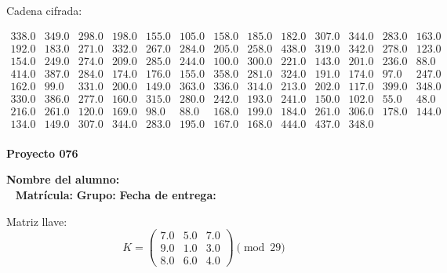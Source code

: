 \documentclass[12pt]{article}
\begin{document}
Cadena cifrada:
\begin{center}
$\begin{array}{lllllllllllll}
338.0 & 349.0 & 298.0 & 198.0 & 155.0 & 105.0 & 158.0 & 185.0 & 182.0 & 307.0 & 344.0 & 283.0 & 163.0\\
192.0 & 183.0 & 271.0 & 332.0 & 267.0 & 284.0 & 205.0 & 258.0 & 438.0 & 319.0 & 342.0 & 278.0 & 123.0\\
154.0 & 249.0 & 274.0 & 209.0 & 285.0 & 244.0 & 100.0 & 300.0 & 221.0 & 143.0 & 201.0 & 236.0 & 88.0\\
414.0 & 387.0 & 284.0 & 174.0 & 176.0 & 155.0 & 358.0 & 281.0 & 324.0 & 191.0 & 174.0 & 97.0 & 247.0\\
162.0 & 99.0 & 331.0 & 200.0 & 149.0 & 363.0 & 336.0 & 314.0 & 213.0 & 202.0 & 117.0 & 399.0 & 348.0\\
330.0 & 386.0 & 277.0 & 160.0 & 315.0 & 280.0 & 242.0 & 193.0 & 241.0 & 150.0 & 102.0 & 55.0 & 48.0\\
216.0 & 261.0 & 120.0 & 169.0 & 98.0 & 88.0 & 168.0 & 199.0 & 184.0 & 261.0 & 306.0 & 178.0 & 144.0\\
134.0 & 149.0 & 307.0 & 344.0 & 283.0 & 195.0 & 167.0 & 168.0 & 444.0 & 437.0 & 348.0\\
\end{array}$
\end{center}

\newpage


\textbf{Proyecto 076}

\textbf{Nombre del alumno:} \underline{\hspace{13cm}}\\\
\vspace{1cm}
\textbf{Matrícula:} \underline{\hspace{4cm}} \hspace{1cm}
\textbf{Grupo:} \underline{\hspace{2cm}}
\textbf{Fecha de entrega:} \underline{\hspace{2cm}}

\medskip

Matriz llave:
\[
K = \begin{pmatrix}
7.0 & 5.0 & 7.0\\
9.0 & 1.0 & 3.0\\
8.0 & 6.0 & 4.0
\end{pmatrix} \pmod{29}
\]
\end{document}
